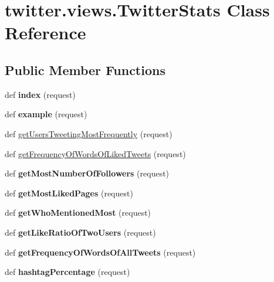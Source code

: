 \hypertarget{classtwitter_1_1views_1_1_twitter_stats}{}\section{twitter.\+views.\+Twitter\+Stats Class Reference}
\label{classtwitter_1_1views_1_1_twitter_stats}
\subsection*{Public Member Functions}
\begin{DoxyCompactItemize}
\item 
\mbox{\label{classtwitter_1_1views_1_1_twitter_stats_ae34b27b044e8f8493952f856866e1528}} 
def {\bfseries index} (request)
\item 
\mbox{\label{classtwitter_1_1views_1_1_twitter_stats_af34b050b301a95d439181f762ec5448f}} 
def {\bfseries example} (request)
\item 
def \hyperlink{classtwitter_1_1views_1_1_twitter_stats_a1b25912ecee8b0ee19af0948378a57fa}{get\+Users\+Tweeting\+Most\+Frequently} (request)
\item 
def \hyperlink{classtwitter_1_1views_1_1_twitter_stats_a880c4da522b5f91c401c54861dc3ad12}{get\+Frequency\+Of\+Words\+Of\+Liked\+Tweets} (request)
\item 
\mbox{\label{classtwitter_1_1views_1_1_twitter_stats_aab4275f1224264499ea247a721fa23ce}} 
def {\bfseries get\+Most\+Number\+Of\+Followers} (request)
\item 
\mbox{\label{classtwitter_1_1views_1_1_twitter_stats_ae955472d98f39a044a91efef95b7b156}} 
def {\bfseries get\+Most\+Liked\+Pages} (request)
\item 
\mbox{\label{classtwitter_1_1views_1_1_twitter_stats_a45827ee187a326fb1394d680bc483fb9}} 
def {\bfseries get\+Who\+Mentioned\+Most} (request)
\item 
\mbox{\label{classtwitter_1_1views_1_1_twitter_stats_ae06146619068fb60465d6f99c4f9c369}} 
def {\bfseries get\+Like\+Ratio\+Of\+Two\+Users} (request)
\item 
\mbox{\label{classtwitter_1_1views_1_1_twitter_stats_a48eab8e241bb382791c9f2803b57ca34}} 
def {\bfseries get\+Frequency\+Of\+Words\+Of\+All\+Tweets} (request)
\item 
\mbox{\label{classtwitter_1_1views_1_1_twitter_stats_a78a796f6ed9c85bd1b8d5614138b84e6}} 
def {\bfseries hashtag\+Percentage} (request)
\end{DoxyCompactItemize}
